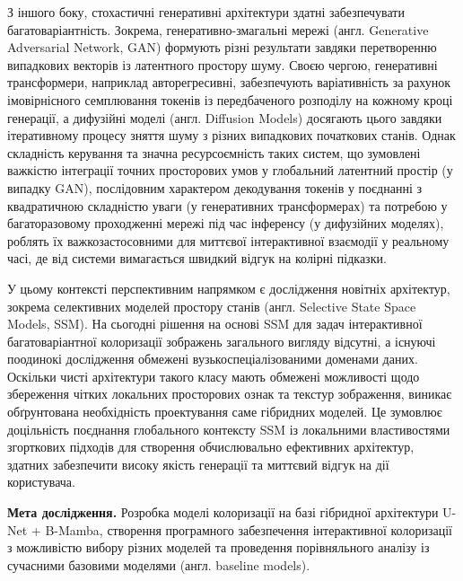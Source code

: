        З іншого боку, стохастичні генеративні архітектури здатні забезпечувати багатоваріантність. 
        Зокрема, генеративно-змагальні мережі (англ. Generative Adversarial Network, GAN) формують різні результати завдяки перетворенню випадкових векторів із латентного простору шуму.
        Своєю чергою, генеративні трансформери, наприклад авторегресивні, забезпечують варіативність за рахунок імовірнісного семплювання токенів із передбаченого розподілу на кожному кроці генерації, 
        а дифузійні моделі (англ. Diffusion Models) досягають цього завдяки ітеративному процесу зняття шуму з різних випадкових початкових станів.
        Однак складність керування та значна ресурсоємність таких систем, що зумовлені важкістю інтеграції точних просторових умов у глобальний латентний простір (у випадку GAN), послідовним характером декодування токенів у поєднанні з квадратичною складністю уваги (у генеративних трансформерах) та потребою у багаторазовому проходженні мережі під час інференсу (у дифузійних моделях),
        роблять їх важкозастосовними для миттєвої інтерактивної взаємодії у реальному часі, де від системи вимагається швидкий відгук на колірні підказки.

        У цьому контексті перспективним напрямком є дослідження новітніх архітектур, зокрема селективних моделей простору станів (англ. Selective State Space Models, SSM).
        На сьогодні рішення на основі SSM для задач інтерактивної багатоваріантної колоризації зображень загального вигляду відсутні,
        а існуючі поодинокі дослідження обмежені вузькоспеціалізованими доменами даних.
        Оскільки чисті архітектури такого класу мають обмежені можливості щодо збереження чітких локальних просторових ознак та текстур зображення,
        виникає обґрунтована необхідність проектування саме гібридних моделей.
        Це зумовлює доцільність поєднання глобального контексту SSM із локальними властивостями згорткових підходів для створення обчислювально ефективних архітектур,
        здатних забезпечити високу якість генерації та миттєвий відгук на дії користувача.

    \textbf{Мета дослідження.}  %
        Розробка моделі колоризації на базі гібридної архітектури U-Net + B-Mamba,
        створення програмного забезпечення інтерактивної колоризації з можливістю вибору різних моделей
        та проведення порівняльного аналізу із сучасними базовими моделями (англ. baseline models).

